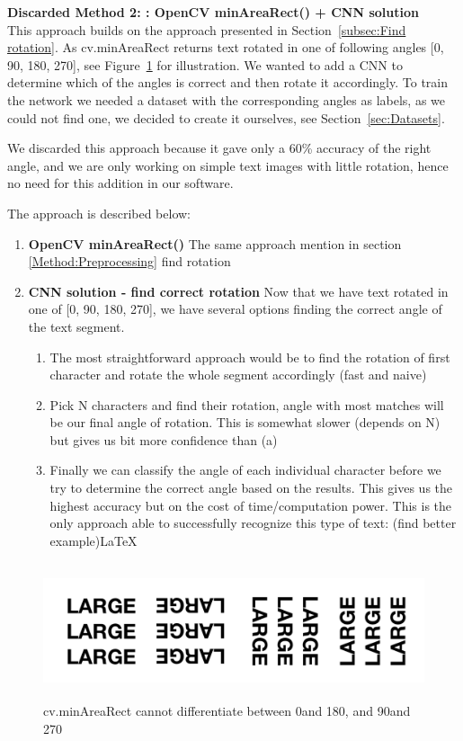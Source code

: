 \documentclass[Report.tex]{subfiles}
\begin{document}
\begin{flushleft}
  \textbf{Discarded Method 2: : OpenCV minAreaRect() + CNN solution} \\
  This approach builds on the approach presented in Section~\ref{subsec:Find rotation}. As cv.minAreaRect returns text rotated in one of following angles [0\textdegree, 90\textdegree, 180\textdegree, 270\textdegree], see Figure~\ref{fig:4angle_rot} for illustration. We wanted to add a CNN to determine which of the angles is correct and then rotate it accordingly.
  To train the network we needed a dataset with the corresponding angles as labels, as we could not find one, we decided to create it ourselves, see Section~\ref{sec:Datasets}. \par
  We discarded this approach because it gave only a 60\% accuracy of the right angle, and we are only working on simple text images with little rotation, hence no need for this addition in our software. \par
  The approach is described below:
  \begin{enumerate}
    \item \textbf{OpenCV minAreaRect()}
    The same approach mention in section \ref{Method:Preprocessing} find rotation
    \item \textbf{CNN solution - find correct rotation}
    Now that we have text rotated in one of [0\textdegree, 90\textdegree, 180\textdegree, 270\textdegree], we have several options finding the correct angle of the text segment.
    \begin{enumerate}
      \item{The most straightforward approach would be to find the rotation of first character and rotate the whole segment accordingly (fast and naive)}
      \item{Pick N characters and find their rotation, angle with most matches will be our final angle of rotation. This is somewhat slower (depends on N) but gives us bit more confidence than (a)}
      \item{Finally we can classify the angle of each individual character before we try to determine the correct angle based on the results. This gives us the highest accuracy but on the cost of time/computation power. This is the only approach able to successfully recognize this type of text: (find better example)\LaTeX}
      \end{enumerate}
    \end{enumerate}

    \begin{figure}[H]
      \centering
      \includegraphics[height=4cm]{res/4angle_rot.png}
      \caption{cv.minAreaRect cannot differentiate between 0\textdegree and 180\textdegree, and 90\textdegree and 270\textdegree}
      \label{fig:4angle_rot}
    \end{figure}


\end{flushleft}
\end{document}
